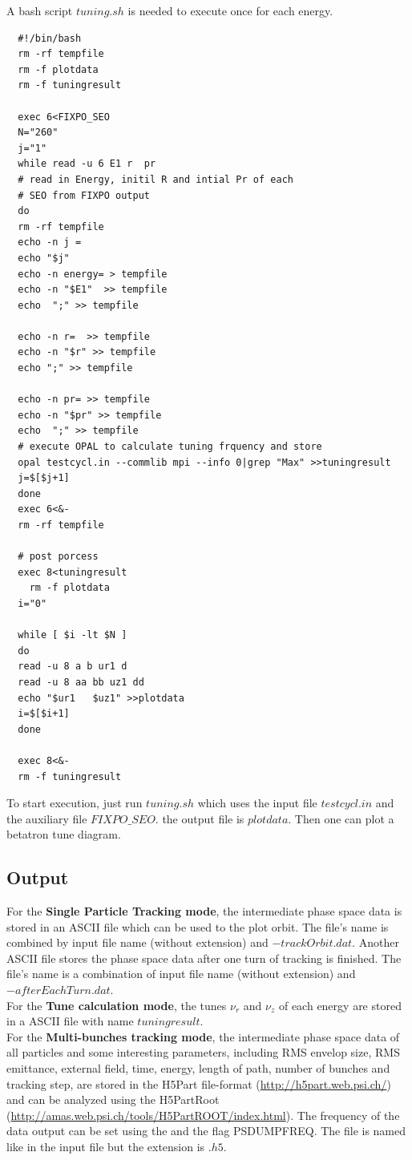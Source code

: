 A bash script $tuning.sh$ is needed to execute \opalcycl once for each energy. 
{ \footnotesize
\begin{verbatim}
  #!/bin/bash
  rm -rf tempfile
  rm -f plotdata
  rm -f tuningresult

  exec 6<FIXPO_SEO
  N="260"
  j="1"
  while read -u 6 E1 r  pr
  # read in Energy, initil R and intial Pr of each 
  # SEO from FIXPO output
  do
  rm -rf tempfile
  echo -n j =
  echo "$j"
  echo -n energy= > tempfile
  echo -n "$E1"  >> tempfile
  echo  ";" >> tempfile

  echo -n r=  >> tempfile
  echo -n "$r" >> tempfile
  echo ";" >> tempfile

  echo -n pr= >> tempfile
  echo -n "$pr" >> tempfile
  echo  ";" >> tempfile
  # execute OPAL to calculate tuning frquency and store
  opal testcycl.in --commlib mpi --info 0|grep "Max" >>tuningresult
  j=$[$j+1]
  done
  exec 6<&-
  rm -rf tempfile

  # post porcess
  exec 8<tuningresult
    rm -f plotdata
  i="0"

  while [ $i -lt $N ]
  do
  read -u 8 a b ur1 d
  read -u 8 aa bb uz1 dd
  echo "$ur1   $uz1" >>plotdata
  i=$[$i+1]
  done

  exec 8<&-
  rm -f tuningresult
\end{verbatim}
}
To start execution, just run $tuning.sh$ which uses the input file $testcycl.in$ and the auxiliary file {\footnotesize$FIXPO\_SEO$}.
the output file is $plotdata$. Then one can plot a betatron tune diagram.

\subsection{Output}  
For the {\bfseries Single Particle Tracking mode}, the intermediate phase space data is stored in an ASCII file which can be used to
the plot orbit. The file's name is combined by input file name (without extension) and $-trackOrbit.dat$.
Another ASCII file stores the phase space data after one turn of tracking is finished. The file's name is a combination of input file name 
(without extension) and $-afterEachTurn.dat$.\\
 
For the {\bfseries Tune calculation mode}, the tunes $\nu_r$ and $\nu_z$ of each energy are stored in a ASCII file with name 
$tuningresult$.\\

For the {\bfseries Multi-bunches tracking mode}, the intermediate phase space data of all particles and some interesting parameters, 
including RMS envelop size, RMS emittance, external field, time, energy, length of path, number of bunches and 
tracking step, are stored in the H5Part file-format (\url{http://h5part.web.psi.ch/}) and can be analyzed
using the H5PartRoot (\url{http://amas.web.psi.ch/tools/H5PartROOT/index.html}). The frequency 
of the data output can be set using the  and the flag PSDUMPFREQ. 
The file is named like in the input file but the extension is $.h5$. 

